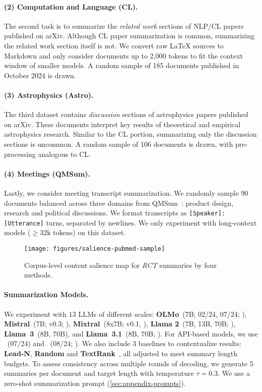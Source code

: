 \paragraph{(2) Computation and Language (CL).} The second task is to summarize the \emph{related work} sections of NLP/CL papers published on arXiv.
Although CL paper summarization is common, summarizing the related work section itself is not.
We convert raw LaTeX sources to Markdown and only consider documents up to 2,000 tokens to fit the context window of smaller models.
A random sample of 185 documents published in October 2024 is drawn.

\paragraph{(3) Astrophysics (Astro).} The third dataset contains \emph{discussion} sections of astrophysics papers published on arXiv.
These documents interpret key results of theoretical and empirical astrophysics research.
Similar to the CL portion, summarizing only the discussion sections is uncommon.
A random sample of 106 documents is drawn, with pre-processing analogous to CL.

\paragraph{(4) Meetings (QMSum).} Lastly, we consider meeting transcript summarization.
We randomly sample 90 documents balanced across three domains from QMSum~\cite{Zhong:2021:NAACL}: product design, research and political discussions.
We format transcripts as \texttt{\small [Speaker]: [Utterance]} turns, separated by newlines.
We only experiment with long-context models ($\ge 32\text{k}$ tokens) on this dataset.

\begin{figure*}[t]
\texttt{[image: figures/salience-pubmed-sample]}
\caption{Corpus-level content salience map for \emph{RCT} summaries by four methods.}
\label{fig:salience-pubmed}
\end{figure*}

\paragraph{Summarization Models.}
We experiment with 13 LLMs of different scales:
\textbf{OLMo}~(7B; 02/24, 07/24; \citealp{Groeneveld:2024:ACL}), \textbf{Mistral}~(7B; v0.3; \citealp{Jiang:2023:arXiv}), \textbf{Mixtral}~(8x7B; v0.1, \citealp{Jiang:2024:arXiv}), \textbf{Llama 2}~(7B, 13B, 70B; \citealp{Touvron:2023:arXiv}), \textbf{Llama~3}~(8B, 70B), and \textbf{Llama~3.1}~(8B, 70B; \citealp{Grattafiori:2024:arXiv}). For API-based models, we use \textbf{\gptmini}~(07/24) and \textbf{\gpt}~(08/24; \citealp{OpenAI:2024:arXiv}).
We also include 3 baselines to contextualize results: \textbf{Lead-N}, \textbf{Random} and \textbf{TextRank}~\cite{Mihalcea:2004:EMNLP}, all adjusted to meet summary length budgets. To assess consistency across multiple rounds of decoding, we generate 5 summaries per document and target length with temperature $\tau = 0.3$.
We use a zero-shot summarization prompt (\cref{sec:appendix-prompts}).

